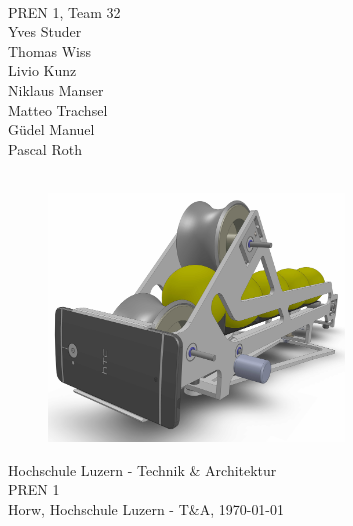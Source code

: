 \begin{titlepage}
    \begin{center}
        \parindent0pt{\Huge\bfseries \myDokumentTyp}\\
        \vspace*{0.5cm}
        {\huge PREN 1, Team 32}\\
        \vspace*{1.2cm}
        Yves Studer\\
        Thomas Wiss\\
        Livio Kunz\\
        Niklaus Manser\\
        Matteo Trachsel\\
        Güdel Manuel\\
        Pascal Roth\\
        \vspace*{1cm}
        {\Huge \myTitel}\\
        \vspace*{0.5cm}
        \begin{figure}[h!]
            \centering
            \includegraphics[width=0.7\textwidth]{Enddokumentation/Titelbild.JPG}
        \end{figure}
        \vspace*{1cm}
        {\normalsize Hochschule Luzern - Technik \& Architektur}\\
        {\normalsize PREN 1}\\
        \vspace*{0.6cm}
        {\normalsize Horw, Hochschule Luzern - T\&A, \today}\\
    \end{center}
\end{titlepage}
